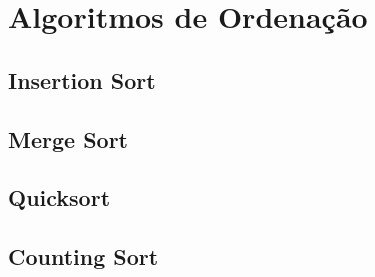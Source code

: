 % 

% 

% 

% 


\section{Algoritmos de Ordenação}

\subsection{Insertion Sort}


\subsection{Merge Sort}


\subsection{Quicksort}


\subsection{Counting Sort}


